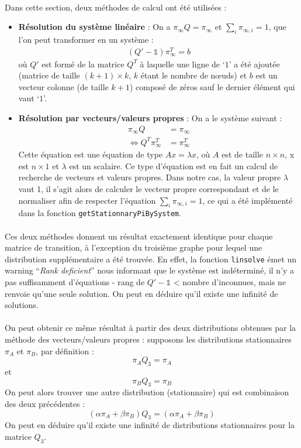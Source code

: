 \documentclass[a4paper,titlepage]{report}
\begin{document}
\paragraph{}
Dans cette section, deux méthodes de calcul ont été utilisées : 
\begin{itemize}
	\item \textbf{Résolution du système linéaire} : On a $\pi_{\infty} Q = \pi_{\infty}$ et $\sum_i \pi_{\infty, i} = 1$, que l'on peut transformer en un système : 
	\[
		\begin{aligned}
			(Q' - \mathbb{1}) \pi^T_{\infty} = b
		\end{aligned}
	\]
	où $Q'$ est formé de la matrice $Q^T$ à laquelle une ligne de `$1$' a été ajoutée (matrice de taille $(k+1) \times k$, $k$ étant le nombre de nœuds) et $b$ est un vecteur colonne (de taille $k+1$) composé de zéros sauf le dernier élément qui vaut `$1$'.
	\item \textbf{Résolution par vecteurs/valeurs propres} : On a le système suivant : 
	\[
		\begin{aligned}
			\pi_{\infty} Q &= \pi_{\infty}\\
			\Leftrightarrow Q^T \pi^T_{\infty} &= \pi^T_{\infty}
		\end{aligned}
	\]
	Cette équation est une équation de type $Ax = \lambda x$, où $A$ est de taille $n\times n$, x est $n\times 1$ et $\lambda$ est un scalaire. Ce type d'équation est en fait un calcul de recherche de vecteurs et valeurs propres. Dans notre cas, la valeur propre $\lambda$ vaut 1, il s'agit alors de calculer le vecteur propre correspondant et de le normaliser afin de respecter l'équation $\sum_i \pi_{\infty, i} = 1$, ce qui a été implémenté dans la fonction \texttt{getStationnaryPiBySystem}.
\end{itemize}
\paragraph{}
Ces deux méthodes donnent un résultat exactement identique pour chaque matrice de transition, à l'exception du troisième graphe pour lequel une distribution supplémentaire a été trouvée. En effet, la fonction \texttt{linsolve} émet un warning ``\textit{Rank deficient}'' nous informant que le système est indéterminé, il n'y a pas suffisamment d'équations - rang de $Q' - \mathbb{1}$ < nombre d'inconnues, mais ne renvoie qu'une seule solution. On peut en déduire qu'il existe une infinité de solutions.
\paragraph{}
On peut obtenir ce même résultat à partir des deux distributions obtenues par la méthode des vecteurs/valeurs propres : supposons les distributions stationnaires $\pi_A$ et $\pi_B$, par définition : 
\[
	\pi_A Q_3 = \pi_A
\]
et
\[
	\pi_B Q_3 = \pi_B
\]
On peut alors trouver une autre distribution (stationnaire) qui est combinaison des deux précédentes :
\[
	(\alpha\pi_A + \beta\pi_B) Q_3 = (\alpha\pi_A + \beta\pi_B)
\]
On peut en déduire qu'il existe une infinité de distributions stationnaires pour la matrice $Q_3$.
\end{document}
